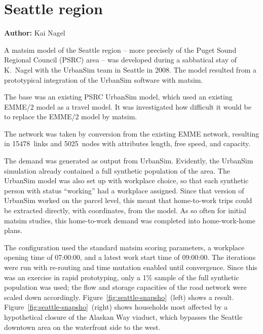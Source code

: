 \section{Seattle region}
\label{ch:scenarios:seattle}
\hfill \textbf{Author:} Kai Nagel

A \acrshort{matsim} model of the Seattle region -- more precisely of the Puget Sound Regional Council (PSRC) area -- was developed during a sabbatical stay of K.\ Nagel with the UrbanSim team in Seattle in 2008.  The model resulted from a prototypical integration of the UrbanSim software \cite[e.g.][]{WaddellEtc2003UrbanSim} with \acrshort{matsim}. 

The base was an existing PSRC UrbanSim model, which used an existing EMME/2 model  as a travel model.  It was investigated how difficult it would be to replace the EMME/2 model by \acrshort{matsim}.

The network was taken by conversion from the existing EMME network, resulting in 15478~links and 5025~nodes with attributes length, free speed, and capacity.

The demand was generated as output from UrbanSim.  Evidently, the UrbanSim simulation already contained a full synthetic population of the area.  The UrbanSim model was also set up with workplace choice, so that each synthetic person with status ``working'' had a workplace assigned.  Since that version of UrbanSim worked on the parcel level, this meant that home-to-work trips could be extracted directly, with coordinates, from the model.  As so often for initial \acrshort{matsim} studies, this home-to-work demand was completed into home-work-home plans.

The configuration used the standard \acrshort{matsim} scoring parameters, a workplace opening time of 07:00:00, and a latest work start time of 09:00:00.  The iterations were run with re-routing and time mutation enabled until convergence.  Since this was an exercise in rapid prototyping, only a 1\% sample of the full synthetic population was used; the flow and storage capacities of the road network were scaled down accordingly.  Figure~\ref{fig:seattle-snapsho}~(left) shows a result.  Figure~\ref{fig:seattle-snapsho}~(right) shows households most affected by a hypothetical closure of the Alaskan Way viaduct, which bypasses the Seattle downtown area on the waterfront side to the west.

